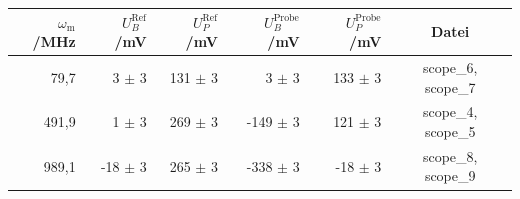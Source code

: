 \begin{center}
    \captionsetup{type=table}
    \begin{tabular}{r | r r r r | c }
        $\omega_\mathrm{m}$/MHz & $U^{\mathrm{Ref}}_B$/mV & $U^{\mathrm{Ref}}_P$/mV & $U^{\mathrm{Probe}}_B$/mV & $U^{\mathrm{Probe}}_P$/mV & Datei \\ \hline
        79,7   & 3 $\pm$ 3 & 131 $\pm$ 3 & 3 $\pm$ 3 & 133 $\pm$ 3  & scope\_6, scope\_7 \\
        491,9  & 1 $\pm$ 3 & 269 $\pm$ 3 & -149 $\pm$ 3 & 121 $\pm$ 3 & scope\_4, scope\_5 \\
        989,1  & -18 $\pm$ 3 & 265 $\pm$ 3 & -338 $\pm$ 3 & -18 $\pm$ 3 & scope\_8, scope\_9 \\
    \end{tabular}
    \label{tab:absorp}
\end{center}

